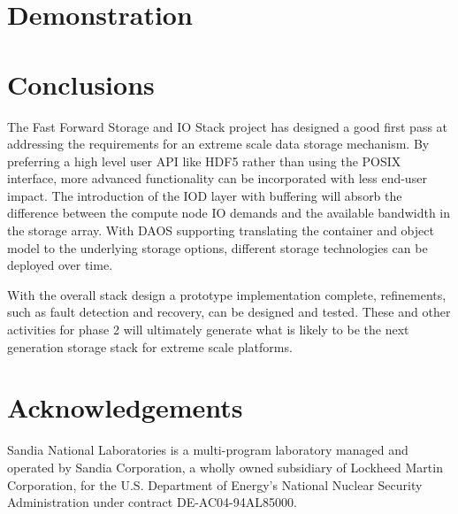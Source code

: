 \documentclass{sig-alt-gov2}
\begin{document}
\section{Demonstration}
\label{sec:evaluation}


\section{Conclusions}
\label{sec:conclusion}

The Fast Forward Storage and IO Stack project has designed a good first pass at
addressing the requirements for an extreme scale data storage mechanism.  By
preferring a high level user API like HDF5 rather than using the POSIX
interface, more advanced functionality can be incorporated with less end-user
impact. The introduction of the IOD layer with buffering will absorb the
difference between the compute node IO demands and the available bandwidth in
the storage array. With DAOS supporting translating the container and object
model to the underlying storage options, different storage technologies can be
deployed over time.

With the overall stack design a prototype implementation complete, refinements,
such as fault detection and recovery, can be designed and tested.  These and
other activities for phase 2 will ultimately generate what is likely to be the
next generation storage stack for extreme scale platforms.

\section{Acknowledgements}

Sandia National Laboratories is a multi-program laboratory managed and operated
by Sandia Corporation, a wholly owned subsidiary of Lockheed Martin
Corporation, for the U.S. Department of Energy's National Nuclear Security
Administration under contract DE-AC04-94AL85000.




\vfill\eject
\end{document}
